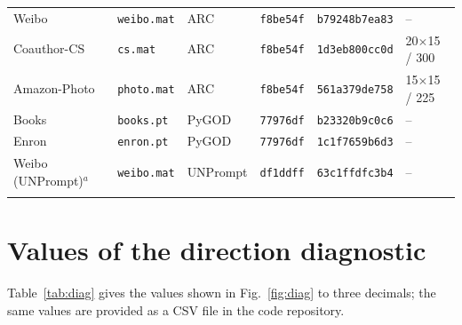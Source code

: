 \documentclass[pdflatex,sn-mathphys-ay]{sn-jnl}
\theoremstyle{plain}
\theoremstyle{remark}
\begin{document}
\begin{appendices}
\begin{table}[h]
\begin{tabular*}{\textwidth}{@{\extracolsep{\fill}}llllll@{}}
Weibo & \texttt{weibo.mat} & ARC & \texttt{f8be54f} & \texttt{b79248b7ea83} & -- \\
Coauthor-CS & \texttt{cs.mat} & ARC & \texttt{f8be54f} & \texttt{1d3eb800cc0d} & 20$\times$15 / 300 \\
Amazon-Photo & \texttt{photo.mat} & ARC & \texttt{f8be54f} & \texttt{561a379de758} & 15$\times$15 / 225 \\
Books & \texttt{books.pt} & PyGOD & \texttt{77976df} & \texttt{b23320b9c0c6} & -- \\
Enron & \texttt{enron.pt} & PyGOD & \texttt{77976df} & \texttt{1c1f7659b6d3} & -- \\
Weibo (UNPrompt)$^{a}$ & \texttt{weibo.mat} & UNPrompt & \texttt{df1ddff} & \texttt{63c1ffdfc3b4} & -- \\
\botrule
\end{tabular*}
\end{table}

\section{Values of the direction diagnostic}\label{app:diag}
\setcounter{table}{0}

Table~\ref{tab:diag} gives the values shown in Fig.~\ref{fig:diag} to three decimals; the same values are provided as a CSV file in the code repository.


\end{appendices}
\end{document}
